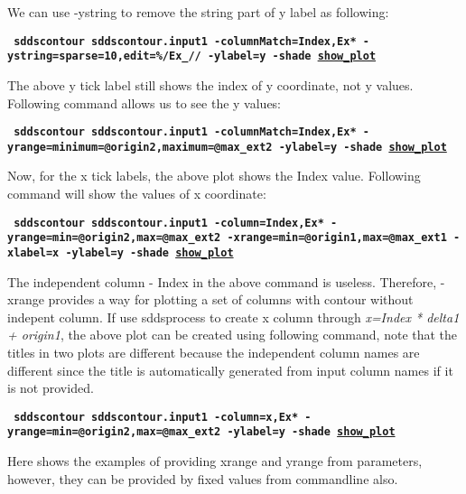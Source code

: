 \begin{itemize}
\begin{itemize}
        We can use -ystring to remove the string part of y label as following:
        \begin{flushleft}{\tt \bf
            sddscontour sddscontour.input1 -columnMatch=Index,Ex* -ystring=sparse=10,edit=\%/Ex\_// -ylabel=y -shade    \href{https://ops.aps.anl.gov/manuals/example_files/sddscontour2_img.html}{show\_plot}
        }\end{flushleft}

        The above y tick label still shows the index of y coordinate, not y values. Following command allows us to see the y values:
        \begin{flushleft}{\tt \bf
            sddscontour sddscontour.input1 -columnMatch=Index,Ex* -yrange=minimum=@origin2,maximum=@max\_ext2 -ylabel=y -shade          \href{https://ops.aps.anl.gov/manuals/example_files/sddscontour3_img.html}{show\_plot}
        }\end{flushleft}

        Now, for the x tick labels, the above plot shows the Index value. Following command will show the values of x coordinate:
    
        \begin{flushleft}{\tt \bf
        sddscontour sddscontour.input1 -column=Index,Ex* -yrange=min=@origin2,max=@max\_ext2 -xrange=min=@origin1,max=@max\_ext1 -xlabel=x -ylabel=y  -shade   \href{https://ops.aps.anl.gov/manuals/example_files/sddscontour4_img.html}{show\_plot}
        }\end{flushleft}  
        
        The independent column - Index in the above command is useless. Therefore, -xrange provides a way for plotting a set of columns with contour without indepent column. If use sddsprocess to create x column through {\em x=Index * delta1 + origin1}, the above plot can be created using following command, note that the titles in two plots are different because the independent column names are different since the title is automatically generated from input column names if it is not provided.

        \begin{flushleft}{\tt \bf
        sddscontour sddscontour.input1 -column=x,Ex* -yrange=min=@origin2,max=@max\_ext2 -ylabel=y -shade   \href{https://ops.aps.anl.gov/manuals/example_files/sddscontour5_img.html}{show\_plot}
        }\end{flushleft}  


       Here shows the examples of providing xrange and yrange from parameters, however, they can be provided by fixed values from commandline also.


\end{itemize}
\end{itemize}
